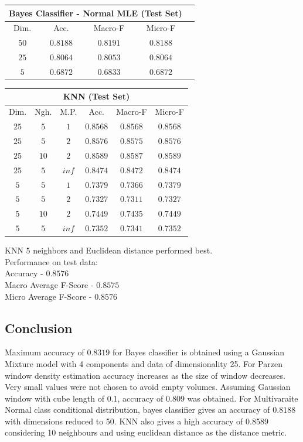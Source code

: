 \documentclass[12pt,journal,compsoc]{IEEEtran}
\begin{document}
\begin{center}
\begin{tabular}{|c|c|c|c|c|}
\multicolumn{4}{c}{Bayes Classifier - Normal MLE (Test Set)}\\
\hline
Dim. & Acc. & Macro-F & Micro-F\\
\hline
$50$ &$0.8188$ &$0.8191$ &$0.8188$\\
\hline
$25$ &$0.8064$ &$0.8053$ &$0.8064$\\
\hline
$5$ &$0.6872$ &$0.6833$ &$0.6872$\\
\hline
\end{tabular}
\vspace{0.2cm}

\begin{tabular}{|c|c|c|c|c|c|}
\multicolumn{6}{c}{KNN (Test Set)}\\
\hline
Dim. & Ngh. & M.P. & Acc. & Macro-F & Micro-F\\
\hline
$25$ &$5$ &$1$ &$0.8568$ &$0.8568$ &$0.8568$\\
\hline
$25$ &$5$ &$2$ &$0.8576$ &$0.8575$ &$0.8576$\\
\hline
$25$ &$10$ &$2$ &$0.8589$ &$0.8587$ &$0.8589$\\
\hline
$25$ &$5$ &$inf$ &$0.8474$ &$0.8472$ &$0.8474$\\
\hline
$5$ &$5$ &$1$ &$0.7379$ &$0.7366$ &$0.7379$\\
\hline
$5$ &$5$ &$2$ &$0.7327$ &$0.7311$ &$0.7327$\\
\hline
$5$ &$10$ &$2$ &$0.7449$ &$0.7435$ &$0.7449$\\
\hline
$5$ &$5$ &$inf$ &$0.7352$ &$0.7341$ &$0.7352$\\
\hline
\end{tabular}
\end{center}
KNN $5$ neighbors and Euclidean distance performed best.\\
Performance on test data:\\ 
Accuracy - $0.8576$\\ Macro Average F-Score - $0.8575$\\
Micro Average F-Score - $0.8576$
\subsection{Conclusion}
\noindent Maximum accuracy of $0.8319$ for Bayes classifier is obtained using a Gaussian Mixture model with 4 components and data of dimensionality 25. For Parzen window density estimation accuracy increases as the size of window decreases. Very small values were not chosen to avoid empty volumes. Assuming Gaussian window with cube length of $0.1$, accuracy of 0.809 was obtained. For Multivaraite Normal class conditional distribution, bayes classifier gives an accuracy of $0.8188$ with dimensions reduced to 50. KNN also gives a high accuracy of 0.8589 considering 10 neighbours and using euclidean distance as the distance metric. 
\end{document}
